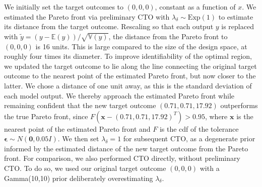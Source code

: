 \documentclass[12pt]{article}
\begin{document}
We initially set the target outcomes to $(0,0,0)$, constant as a function of $x$.
%
We estimated the Pareto front via preliminary CTO with $\lambda_\delta\sim \mathrm{Exp}(1)$ to estimate its distance from the target outcome.
%
%
Rescaling so that each output $y$ is replaced with $\tilde y=(y-\mathbb E(y))/\sqrt{\mathbb V(y)}$, the distance from the Pareto front to $(0,0,0)$ is 16 units.
%
This is large compared to the size of the design space, at roughly four times its diameter.
%
%
%
To improve identifiability of the optimal region, we updated the target outcome to lie along the line connecting the original target outcome to the nearest point of the estimated Pareto front, but now closer to the latter.
%
We chose a distance of one unit away, as this is the standard deviation of each model output.
%
We thereby approach the estimated Pareto front while remaining confident that the new target outcome $(0.71, 0.71, 17.92)$ outperforms the true Pareto front,
%
since $F(\mathbf x-(0.71,0.71,17.92)^T)>0.95$, where $\mathbf x$ is the nearest point of the estimated Pareto front and $F$ is the cdf of the tolerance $\boldsymbol\epsilon\sim N(\mathbf 0, 0.05I)$.
%
We then set $\lambda_\delta=1$ for subsequent CTO, as a degenerate prior informed by the estimated distance of the new target outcome from the Pareto front.
%
%
For comparison, we also performed CTO directly, without preliminary CTO.
%
To do so, we used our original target outcome $(0,0,0)$ with a Gamma(10,10) prior deliberately overestimating $\lambda_\delta$.
%
%
\end{document}
